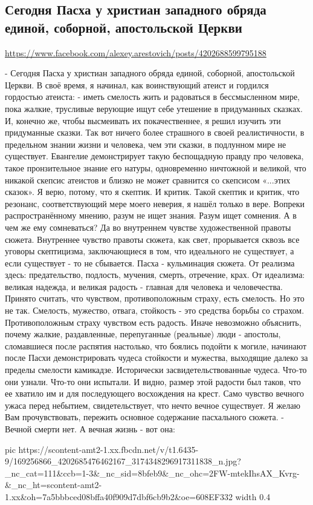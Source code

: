  
 
 
 
 

\subsection{Сегодня Пасха у христиан западного обряда единой, соборной, апостольской Церкви}
\label{sec:04_04_2021.fb.arestovich_aleksej.1.velykden_katoliki}
\url{https://www.facebook.com/alexey.arestovich/posts/4202688599795188}

- Сегодня Пасха у христиан западного обряда единой, соборной, апостольской Церкви. 
В своё время, я начинал, как воинствующий атеист и гордился гордостью атеиста:
- иметь смелость жить и радоваться в бессмысленном мире, пока жалкие, трусливые верующие ищут себе утешение в придуманных сказках.
И, конечно же, чтобы высмеивать их покачественнее, я решил изучить эти придуманные сказки.
Так вот ничего более страшного в своей реалистичности, в предельном знании жизни и человека, чем эти сказки, в подлунном мире не существует. 
Евангелие демонстрирует такую беспощадную правду про человека, такое пронзительное знание его натуры, одновременно ничтожной и великой, что никакой скепсис атеистов и близко не может сравнится со скепсисом «...этих сказок».
Я верю, потому, что я скептик. И критик. 
Такой скептик и критик, что резонанс, соответствующий мере моего неверия, я нашёл только в вере.
Вопреки распространённому мнению, разум не ищет знания. 
Разум ищет сомнения.
А в чем же ему сомневаться?
Да во внутреннем чувстве художественной правоты сюжета. 
Внутреннее чувство правоты сюжета, как свет, прорывается сквозь все уговоры скептицизма, заключающиеся в том, что идеального не существует, а если существует - то не сбывается. 
Пасха - кульминация сюжета.
От реализма здесь: предательство, подлость, мучения, смерть, отречение, крах. 
От идеализма: великая надежда, и великая радость - главная для человека и человечества.
Принято считать, что чувством, противоположным страху, есть смелость.
Но это не так.
Смелость, мужество, отвага, стойкость - это средства борьбы со страхом. 
Противоположным страху чувством есть радость.
Иначе невозможно объяснить, почему жалкие, раздавленные, перепуганные (реальные) люди - апостолы, сломавшиеся после распятия настолько, что боялись подойти к могиле, начинают после Пасхи демонстрировать чудеса стойкости и мужества, выходящие далеко за пределы смелости камикадзе.
Исторически засвидетельствованные чудеса.
Что-то они узнали. Что-то они испытали.
И видно, размер этой радости был таков, что ее хватило им и для последующего восхождения на крест. 
Само чувство вечного ужаса перед небытием, свидетельствует, что нечто вечное существует.
Я желаю Вам прочувствовать, пережить основное содержание пасхального сюжета.
- Вечной смерти нет. 
А вечная жизнь - вот она:


\ifcmt
  pic https://scontent-amt2-1.xx.fbcdn.net/v/t1.6435-9/169256866_4202685476462167_3174348296917311838_n.jpg?_nc_cat=111&ccb=1-3&_nc_sid=8bfeb9&_nc_ohc=2FW-mtekIhsAX_Kvrg-&_nc_ht=scontent-amt2-1.xx&oh=7a5bbbced08bffa40f909d7dbf6cb9b2&oe=608EF332
  width 0.4
\fi

